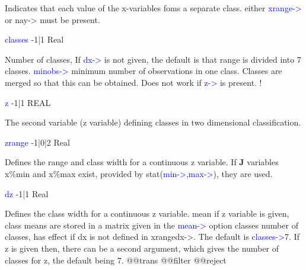\begin{changemargin}{3cm}{0cm}
\noindent Indicates that each value of the x-variables foms a separate class.
either \textcolor{blue}{xrange->} or nay-> must be present.
\end{changemargin}
\vspace{0.3cm}
\hline
\vspace{0.3cm}
\noindent \textcolor{blue}{classes} \tabto{3cm} -1|1 \tabto{5cm}  Real \tabto{7cm}
\begin{changemargin}{3cm}{0cm}
\noindent  Number of classes, If \textcolor{blue}{dx->} is not given, the default is that range is
divided into 7 classes.
\textcolor{blue}{minobs->} minimum number of observations in one class. Classes are merged so that this can
be obtained. Does not work if \textcolor{blue}{z->} is present.
!
\end{changemargin}
\vspace{0.3cm}
\hline
\vspace{0.3cm}
\noindent \textcolor{blue}{z} \tabto{3cm} -1|1 \tabto{5cm}  REAL \tabto{7cm}
\begin{changemargin}{3cm}{0cm}
\noindent  The second variable (z variable) defining classes in two dimensional classification.
\end{changemargin}
\vspace{0.3cm}
\hline
\vspace{0.3cm}
\noindent \textcolor{blue}{zrange}  \tabto{3cm} -1|0|2 \tabto{5cm}  Real \tabto{7cm}
\begin{changemargin}{3cm}{0cm}
\noindent  Defines the range and class width for a continuous z
variable. If \textbf{J} variables x\%min and x\%max exist,
provided by \textcolor{VioletRed}{stat}(\textcolor{blue}{min->},\textcolor{blue}{max->}), they are used.
\end{changemargin}
\vspace{0.3cm}
\hline
\vspace{0.3cm}
\noindent \textcolor{blue}{dz}  \tabto{3cm} -1|1 \tabto{5cm}  Real \tabto{7cm}
\begin{changemargin}{3cm}{0cm}
\noindent  Defines the class width for a continuous z variable.
mean if z variable is given, class means are stored in a matrix given in the \textcolor{blue}{mean->}
option
classes number of classes, has effect if dx is not defined in xrangedx->. The default is
\textcolor{blue}{classes->}7. If z is given then, there can be a second argument, which gives the
number of classes for z, the default being 7.
@@trans
@@filter
@@reject
\end{changemargin}
